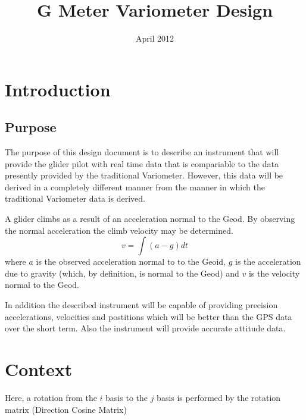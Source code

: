 \documentclass[a4paper]{report}
\title{G Meter Variometer Design}
\numberwithin{equation}{chapter}
\begin{document}
\maketitle
\date{April 2012}

\clearpage\setcounter{page}{1}
\thispagestyle{Contents}

\tableofcontents

\clearpage\setcounter{page}{1}
\thispagestyle{Contents}

\listoffigures


\clearpage\setcounter{page}{1}
\chapter[Introduction]{Introduction}

\section[Purpose]{Purpose}

The purpose of this design document is to describe an instrument that will provide the glider pilot with real time data that is compariable to the data presently provided by the traditional Variometer. However, this data will be derived in a completely different manner from the manner in which the traditional Variometer data is derived.

\bigskip

A glider climbs as a result of an acceleration normal to the Geod. By observing the normal acceleration the climb velocity may be determined.
\begin{equation}
\label{BasicVarioEquation}
v = \int{\left( a - g \right)} dt
\end{equation}
where $a$ is the observed acceleration normal to to the Geoid, $g$ is the acceleration due to gravity (which, by definition, is normal to the Geod) and $v$ is the velocity normal to the Geod.

\bigskip

In addition the described instrument will be capable of providing precision accelerations, velocities and postitions which will be better than the GPS data over the short term. Also the instrument will provide accurate attitude data.

\clearpage\setcounter{page}{1}
\chapter[Context]{Context}

Here, a rotation from the $i$ basis to the $j$ basis is performed by the rotation matrix (Direction Cosine Matrix)
\end{document}
